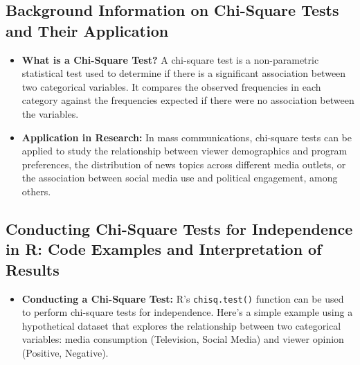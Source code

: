 \documentclass[
]{book}
\providecommand{\tightlist}{%
  \setlength{\itemsep}{0pt}\setlength{\parskip}{0pt}}
\begin{document}
\subsection*{Background Information on Chi-Square Tests and Their Application}\label{background-information-on-chi-square-tests-and-their-application}

\begin{itemize}
\item
  \textbf{What is a Chi-Square Test?} A chi-square test is a non-parametric statistical test used to determine if there is a significant association between two categorical variables. It compares the observed frequencies in each category against the frequencies expected if there were no association between the variables.
\item
  \textbf{Application in Research:} In mass communications, chi-square tests can be applied to study the relationship between viewer demographics and program preferences, the distribution of news topics across different media outlets, or the association between social media use and political engagement, among others.
\end{itemize}

\subsection*{Conducting Chi-Square Tests for Independence in R: Code Examples and Interpretation of Results}\label{conducting-chi-square-tests-for-independence-in-r-code-examples-and-interpretation-of-results}

\begin{itemize}
\tightlist
\item
  \textbf{Conducting a Chi-Square Test:} R's \texttt{chisq.test()} function can be used to perform chi-square tests for independence. Here's a simple example using a hypothetical dataset that explores the relationship between two categorical variables: media consumption (Television, Social Media) and viewer opinion (Positive, Negative).
\end{itemize}
\end{document}
